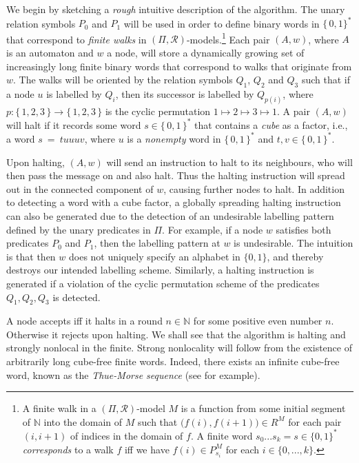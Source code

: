 \documentclass[copyright,creativecommons]{eptcs}
\begin{document}
We begin by sketching a \emph{rough} intuitive description of the algorithm.
The unary relation symbols $P_0$ and $P_1$ will be used in order to define binary words in $\{\, 0,1\}^*$
that correspond to \emph{finite walks} in $(\Pi,\mathcal{R})$-models.\hspace{0.4mm}\footnote{
A finite walk in a $(\Pi,\mathcal{R})$-model $M$ is a function from some initial segment of $\mathbb{N}$
into the domain of $M$ such that 
$\bigl(f(i),f(i+1)\bigr)\in R^{M}$ for each pair $(i,i+1)$ of indices in
the domain of $f$. A finite word $s_0...s_k = s\in\{0,1\}^*$ \emph{corresponds} to a walk $f$
iff we have $f(i) \in P_{s_i}^{M}$ for each $i \in \{0,...,k\}$.}
Each pair $(A,w)$, where $A$ is an automaton and $w$ a node,
will store a dynamically growing set of increasingly long finite binary words that correspond to 
walks that originate from $w$. The walks will be oriented by the relation symbols $Q_1$, $Q_2$ and $Q_3$
such that if a node $u$ is labelled by $Q_i$, then its successor is labelled by $Q_{p(i)}$,
where $p:\{\, 1,2,3\, \}\rightarrow\{\, 1,2,3\, \}$ 
is the cyclic permutation $1\mapsto 2\mapsto 3\mapsto 1$.
A pair $(A,w)$ will halt if it records some word $s\in\{\, 0,1\, \}^*$ that contains a
\emph{cube} as a factor, i.e.,  a word $s\ =\ tuuuv$, where 
$u$ is a \emph{nonempty} word in $\{\, 0,1\, \}^*$ and $t,v\in\{\, 0,1\, \}^*$.




Upon halting, $(A,w)$ will send an instruction to
halt to its neighbours, who will then pass the message on and also halt. Thus the halting instruction
will spread out in the connected component of $w$, causing further nodes to halt.
In addition to detecting a word with a cube factor, a globally spreading 
halting instruction can also be generated due to the detection of an undesirable
labelling pattern defined by the unary predicates in $\Pi$. For example, if a node $w$
satisfies both predicates $P_0$ and $P_1$, then the labelling pattern at $w$
is undesirable. The intuition is that then $w$ does not uniquely specify an alphabet in $\{0,1\}$,
and thereby destroys our intended labelling scheme.
Similarly, a halting instruction is generated if a violation of the cyclic permutation scheme
of the predicates $Q_1,Q_2,Q_3$ is detected.




A node accepts iff it halts in a round $n\in\mathbb{N}$ for some positive even number $n$.
Otherwise it rejects upon halting.
We shall see that the algorithm is halting and strongly nonlocal in the finite.
Strong nonlocality will follow from the existence of arbitrarily long cube-free finite words.
Indeed, there exists an infinite cube-free word, known as the
\emph{Thue-Morse sequence} (see \cite{allouche} for example).
\end{document}
